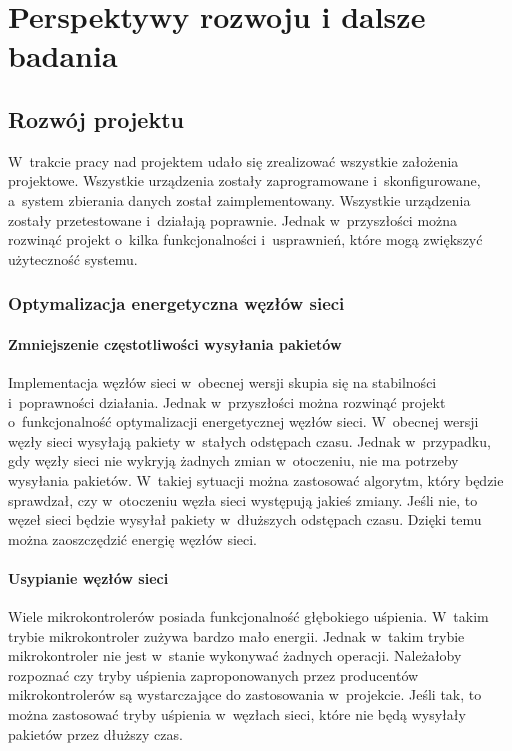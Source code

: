 \chapter{Perspektywy rozwoju i dalsze badania}

\section{Rozwój projektu}
W~trakcie pracy nad projektem udało się zrealizować wszystkie założenia projektowe.
Wszystkie urządzenia zostały zaprogramowane i~skonfigurowane, a~system zbierania danych został zaimplementowany.
Wszystkie urządzenia zostały przetestowane i~działają poprawnie.
Jednak w~przyszłości można rozwinąć projekt o~kilka funkcjonalności i~usprawnień, które mogą zwiększyć użyteczność systemu.

\subsection{Optymalizacja energetyczna węzłów sieci}
\subsubsection*{Zmniejszenie częstotliwości wysyłania pakietów}
Implementacja węzłów sieci w~obecnej wersji skupia się na stabilności i~poprawności działania.
Jednak w~przyszłości można rozwinąć projekt o~funkcjonalność optymalizacji energetycznej węzłów sieci.
W~obecnej wersji węzły sieci wysyłają pakiety w~stałych odstępach czasu.
Jednak w~przypadku, gdy węzły sieci nie wykryją żadnych zmian w~otoczeniu, nie ma potrzeby wysyłania pakietów.
W~takiej sytuacji można zastosować algorytm, który będzie sprawdzał, czy w~otoczeniu węzła sieci występują jakieś zmiany.
Jeśli nie, to węzeł sieci będzie wysyłał pakiety w~dłuższych odstępach czasu.
Dzięki temu można zaoszczędzić energię węzłów sieci.

\subsubsection{Usypianie węzłów sieci}

Wiele mikrokontrolerów posiada funkcjonalność głębokiego uśpienia.
W~takim trybie mikrokontroler zużywa bardzo mało energii.
Jednak w~takim trybie mikrokontroler nie jest w~stanie wykonywać żadnych operacji.
Należałoby rozpoznać czy tryby uśpienia zaproponowanych przez producentów mikrokontrolerów są wystarczające do zastosowania w~projekcie.
Jeśli tak, to można zastosować tryby uśpienia w~węzłach sieci, które nie będą wysyłały pakietów przez dłuższy czas.

